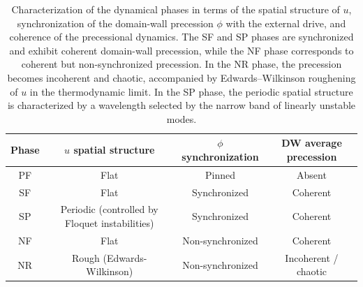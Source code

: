 \documentclass[prb,aps,twocolumn,superscriptaddress,floatfix]{revtex4-1}
\newcommand{\luzcom}[1]{{\color{green!50!black}#1}}
\begin{document}
\begin{table}[t]
\centering
\begin{tabular}{c|c|c|c}
\hline
Phase 
& $u$ spatial structure 
& $\phi$ synchronization
& DW average precession \\
\hline

PF 
& Flat 
& Pinned 
& Absent \\


SF 
& Flat 
& Synchronized 
& Coherent \\

SP 
& Periodic (controlled by Floquet instabilities)
& Synchronized 
& Coherent \\

NF 
& Flat 
& Non-synchronized 
& Coherent \\

NR 
& Rough (Edwards-Wilkinson)
& Non-synchronized 
& Incoherent / chaotic \\
\hline
\end{tabular}
\caption{Characterization of the dynamical phases in terms of the spatial
structure of $u$, synchronization of the domain-wall precession $\phi$
with the external drive, and coherence of the precessional dynamics.
The SF and SP phases are synchronized and exhibit coherent domain-wall
precession, while the NF phase corresponds to coherent but
non-synchronized precession. In the NR phase, the precession becomes
incoherent and chaotic, accompanied by Edwards--Wilkinson roughening of
$u$ in the thermodynamic limit. In the SP phase, the periodic spatial
structure is characterized by a wavelength selected by the narrow band
of linearly unstable modes.}
\label{tab:phases}
\end{table}



\end{document}

